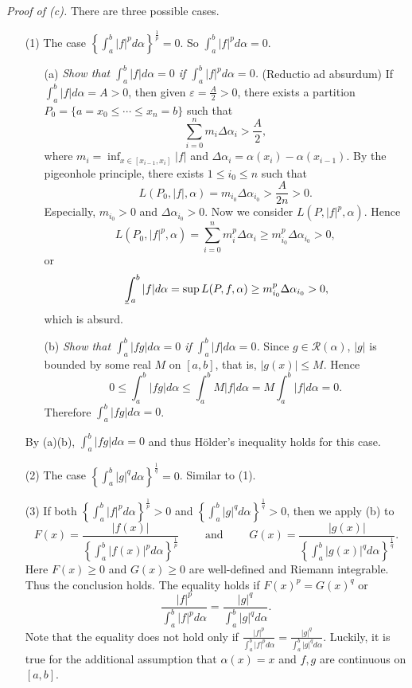 \documentclass{article}
\def\lowint{\mkern3mu\underline{\vphantom{\intop}\mkern7mu}\mkern-10mu\int}
\begin{document}
\emph{Proof of (c).}
There are three possible cases.
\begin{enumerate}
\item[(1)]
  The case $\left\{ \int_{a}^{b} |f|^p d\alpha \right\}^{\frac{1}{p}} = 0$.
  So $\int_{a}^{b} |f|^p d\alpha = 0$.

  \begin{enumerate}
  \item[(a)]
  \emph{Show that $\int_{a}^{b} |f| d\alpha = 0$ if $\int_{a}^{b} |f|^p d\alpha = 0$.}
  (Reductio ad absurdum)
  If $\int_{a}^{b} |f| d\alpha = A > 0$, then given $\varepsilon = \frac{A}{2} > 0$,
  there exists a partition $P_0 = \{a=x_0 \leq \cdots \leq x_n = b \}$ such that
  \[
    \sum_{i=0}^{n} m_i \Delta \alpha_i > \frac{A}{2},
  \]
  where $m_i = \inf_{x \in [x_{i-1},x_i]} |f|$ and
  $\Delta \alpha_i = \alpha(x_i) - \alpha(x_{i-1})$.
  By the pigeonhole principle,
  there exists $1 \leq i_0 \leq n$
  such that
  \[
    L(P_0,|f|,\alpha) = m_{i_0} \Delta \alpha_{i_0} > \frac{A}{2n} > 0.
  \]
  Especially, $m_{i_0} > 0$ and $\Delta \alpha_{i_0} > 0$.
  Now we consider $L(P,|f|^p,\alpha)$.
  Hence
  \[
    L(P_0,|f|^p,\alpha)
  = \sum_{i=0}^{n} m_i^p \Delta \alpha_i
  \geq m_{i_0}^p \Delta \alpha_{i_0} > 0,
  \]
  or
  \[
    \lowint_{a}^{b}|f|d\alpha = \sup L(P,f,\alpha) \geq m_{i_0}^p \Delta \alpha_{i_0} > 0,
  \]
  which is absurd.

  \item[(b)]
  \emph{Show that $\int_{a}^{b} |fg| d\alpha = 0$ if $\int_{a}^{b} |f| d\alpha = 0$.}
  Since $g \in \mathscr{R}(\alpha)$, $|g|$ is bounded by some real $M$ on $[a,b]$,
  that is, $|g(x)| \leq M$.
  Hence
  \[
    0
  \leq \int_{a}^{b} |fg| d\alpha
  \leq \int_{a}^{b} M|f| d\alpha
  = M \int_{a}^{b}|f| d\alpha
  = 0.
  \]
  Therefore $\int_{a}^{b} |fg| d\alpha = 0$.
  \end{enumerate}
  By (a)(b), $\int_{a}^{b} |fg| d\alpha = 0$
  and thus H\"older's inequality holds for this case.

\item[(2)]
  The case $\left\{ \int_{a}^{b} |g|^q d\alpha \right\}^{\frac{1}{q}} = 0$.
  Similar to (1).

\item[(3)]
  If both
  $\left\{ \int_{a}^{b} |f|^p d\alpha \right\}^{\frac{1}{p}} > 0$
  and
  $\left\{ \int_{a}^{b} |g|^q d\alpha \right\}^{\frac{1}{q}} > 0$,
  then we apply (b)
  to
  \[
    F(x) = \frac{|f(x)|}{\left\{ \int_{a}^{b} |f(x)|^p d\alpha \right\}^{\frac{1}{p}}}
    \qquad
    \text{ and }
    \qquad
    G(x) = \frac{|g(x)|}{\left\{ \int_{a}^{b} |g(x)|^q d\alpha \right\}^{\frac{1}{q}}}.
  \]
  Here $F(x) \geq 0$ and $G(x) \geq 0$ are well-defined and Riemann integrable.
  Thus the conclusion holds.
  The equality holds if $F(x)^p = G(x)^q$
  or
  \[
    \frac{|f|^p}{\int_{a}^{b} |f|^p d\alpha}
    =
    \frac{|g|^q}{\int_{a}^{b} |g|^q d\alpha}.
  \]
  Note that the equality does not hold only if
  $\frac{|f|^p}{\int_{a}^{b} |f|^p d\alpha}
  =
  \frac{|g|^q}{\int_{a}^{b} |g|^q d\alpha}$.
  Luckily, it is true for the additional assumption that
  $\alpha(x) = x$ and $f, g$ are continuous on $[a,b]$.
\end{enumerate}
\end{document}
